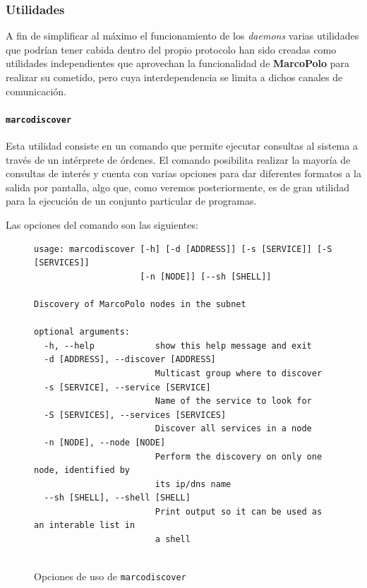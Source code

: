 \subsubsection{Utilidades}

A fin de simplificar al máximo el funcionamiento de los \textit{daemons} varias utilidades que podrían tener cabida dentro del propio protocolo han sido creadas como utilidades independientes que aprovechan la funcionalidad de \textbf{MarcoPolo} para realizar su cometido, pero cuya interdependencia se limita a dichos canales de comunicación.

\paragraph{\texttt{marcodiscover}\\}
\label{marcodiscover}
Esta utilidad consiste en un comando que permite ejecutar consultas al sistema a través de un intérprete de órdenes. El comando posibilita realizar la mayoría de consultas de interés y cuenta con varias opciones para dar diferentes formatos a la salida por pantalla, algo que, como veremos posteriormente, es de gran utilidad para la ejecución de un conjunto particular de programas.

Las opciones del comando son las siguientes:

\begin{figure}[H]
\centering
\begin{lstlisting}
usage: marcodiscover [-h] [-d [ADDRESS]] [-s [SERVICE]] [-S [SERVICES]]
                     [-n [NODE]] [--sh [SHELL]]

Discovery of MarcoPolo nodes in the subnet

optional arguments:
  -h, --help            show this help message and exit
  -d [ADDRESS], --discover [ADDRESS]
                        Multicast group where to discover
  -s [SERVICE], --service [SERVICE]
                        Name of the service to look for
  -S [SERVICES], --services [SERVICES]
                        Discover all services in a node
  -n [NODE], --node [NODE]
                        Perform the discovery on only one node, identified by
                        its ip/dns name
  --sh [SHELL], --shell [SHELL]
                        Print output so it can be used as an interable list in
                        a shell


\end{lstlisting}
\caption{Opciones de uso de \texttt{marcodiscover}}
\label{fig:marcodiscover_help}
\end{figure}

